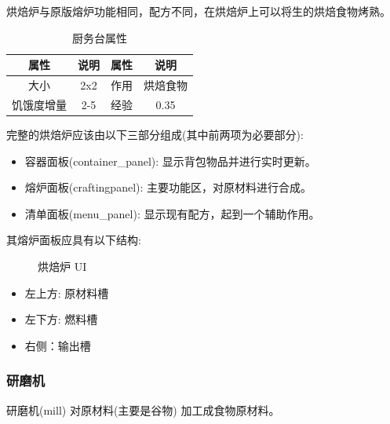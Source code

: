 烘焙炉与原版熔炉功能相同，配方不同，在烘焙炉上可以将生的烘焙食物烤熟。

\begin{table}[H]
    \centering
    \caption{厨务台属性}
    \setlength{\tabcolsep}{4mm}
    \begin{tabular}{c|cc|c}
        \toprule
        \textbf{属性} & \textbf{说明} & \textbf{属性} & \textbf{说明} \\
        \midrule
        大小 & 2x2 & 作用 & 烘焙食物 \\
        饥饿度增量 & 2-5 & 经验 & 0.35 \\
        \bottomrule
    \end{tabular}
\end{table}

完整的烘焙炉应该由以下三部分组成(其中前两项为必要部分):
\begin{itemize}
    \item 容器面板(container\_panel): 显示背包物品并进行实时更新。
    \item 熔炉面板(crafting\-panel): 主要功能区，对原材料进行合成。
    \item 清单面板(menu\_panel): 显示现有配方，起到一个辅助作用。
\end{itemize}

其熔炉面板应具有以下结构:

\begin{figure}[H]
    \centering
    \caption{烘焙炉 UI}
\end{figure}

\begin{itemize}
    \item 左上方: 原材料槽
    \item 左下方: 燃料槽
    \item 右侧：输出槽
\end{itemize}

\subsubsection{研磨机}

研磨机(mill) 对原材料(主要是谷物) 加工成食物原材料。

